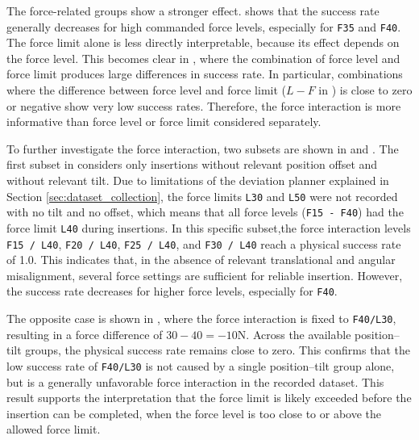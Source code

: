 The force-related groups show a stronger effect.  shows that the success rate generally decreases for high commanded force levels, especially for \texttt{F35} and \texttt{F40}. The force limit alone is less directly interpretable, because its effect depends on the force level. This becomes clear in , where the combination of force level and force limit produces large differences in success rate. In particular, combinations where the difference between force level and force limit ($L - F$ in ) is close to zero or negative show very low success rates. Therefore, the force interaction is more informative than force level or force limit considered separately.

To further investigate the force interaction, two subsets are shown in  and . The first subset in  considers only insertions without relevant position offset and without relevant tilt. Due to limitations of the deviation planner explained in Section \ref{sec:dataset_collection}, the force limits \texttt{L30} and \texttt{L50} were not recorded with no tilt and no offset, which means that all force levels (\texttt{F15 - F40}) had the force limit \texttt{L40} during insertions. In this specific subset,the force interaction levels \texttt{F15 / L40}, \texttt{F20 / L40}, \texttt{F25 / L40}, and \texttt{F30 / L40} reach a physical success rate of 1.0. This indicates that, in the absence of relevant translational and angular misalignment, several force settings are sufficient for reliable insertion. However, the success rate decreases for higher force levels, especially for \texttt{F40}.

The opposite case is shown in , where the force interaction is fixed to \texttt{F40/L30}, resulting in a force difference of $30 - 40 = -10$N. Across the available position--tilt groups, the physical success rate remains close to zero. This confirms that the low success rate of \texttt{F40/L30} is not caused by a single position--tilt group alone, but is a generally unfavorable force interaction in the recorded dataset. This result supports the interpretation that the force limit is likely exceeded before the insertion can be completed, when the force level is too close to or above the allowed force limit.

